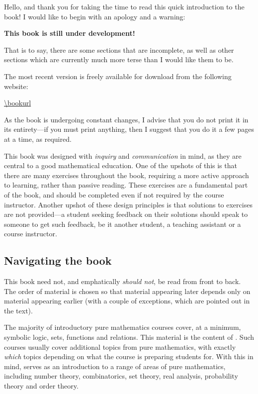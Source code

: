 Hello, and thank you for taking the time to read this quick introduction to the book! I would like to begin with an apology and a warning:
\begin{center}
\Large \color{red} \bf This book is still under development!
\end{center}
That is to say, there are some sections that are incomplete, as well as other sections which are currently much more terse than I would like them to be.

The most recent version is freely available for download from the following website:
\begin{center}
\url{\bookurl}
\end{center}
As the book is undergoing constant changes, I advise that you do not print it in its entirety---if you must print anything, then I suggest that you do it a few pages at a time, as required.

This book was designed with \textit{inquiry} and \textit{communication} in mind, as they are central to a good mathematical education. One of the upshots of this is that there are many exercises throughout the book, requiring a more active approach to learning, rather than passive reading. These exercises are a fundamental part of the book, and should be completed even if not required by the course instructor. Another upshot of these design principles is that solutions to exercises are not provided---a student seeking feedback on their solutions should speak to someone to get such feedback, be it another student, a teaching assistant or a course instructor.

\subsection*{Navigating the book}

This book need not, and emphatically \textit{should not}, be read from front to back. The order of material is chosen so that material appearing later depends only on material appearing earlier (with a couple of exceptions, which are pointed out in the text).

The majority of introductory pure mathematics courses cover, at a minimum, symbolic logic, sets, functions and relations. This material is the content of . Such courses usually cover additional topics from pure mathematics, with exactly \textit{which} topics depending on what the course is preparing students for. With this in mind,  serves as an introduction to a range of areas of pure mathematics, including number theory, combinatorics, set theory, real analysis, probability theory and order theory.

